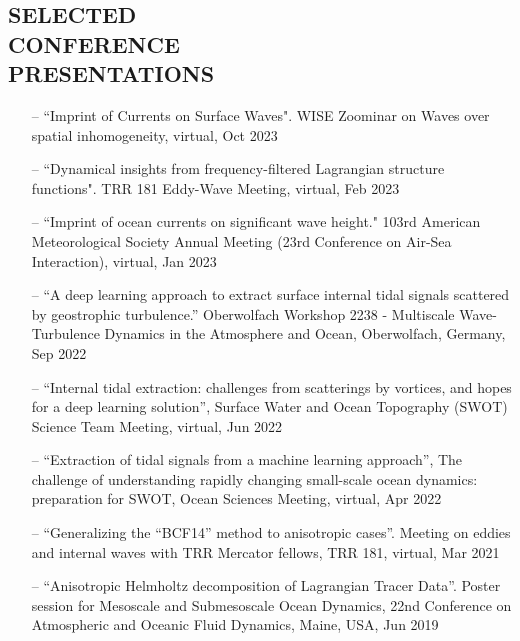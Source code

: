 \documentclass[margin]{res}
\begin{document}
\begin{resume}
\section{{\normalfont SELECTED\\CONFERENCE\\ PRESENTATIONS}}
\begin{itemize}[leftmargin=*,noitemsep]
\item[--]``Imprint of Currents on Surface Waves".  WISE Zoominar on Waves over spatial inhomogeneity, virtual, Oct 2023
\item[--]``Dynamical insights from frequency-filtered Lagrangian structure functions". TRR 181 Eddy-Wave Meeting, virtual, Feb 2023
\item[--] ``Imprint of ocean currents on significant wave height." 103rd American Meteorological Society Annual Meeting (23rd Conference on Air-Sea Interaction), virtual, Jan 2023
\item[--] “A deep learning approach to extract surface internal tidal signals scattered by geostrophic turbulence.”  Oberwolfach Workshop 2238 - Multiscale Wave-Turbulence Dynamics in the Atmosphere and Ocean, Oberwolfach, Germany, Sep 2022
\item[--] “Internal tidal extraction: challenges from scatterings by vortices, and hopes for a deep learning solution”, Surface Water and Ocean Topography (SWOT) Science Team Meeting, virtual, Jun 2022
\item[--] “Extraction of tidal signals from a machine learning approach”, The challenge of understanding rapidly changing small-scale ocean dynamics: preparation for SWOT, Ocean Sciences Meeting, virtual, Apr 2022
\item[--] “Generalizing the “BCF14” method to anisotropic cases”. Meeting on eddies and internal waves with TRR Mercator fellows, TRR 181, virtual, Mar 2021
\item[--] “Anisotropic Helmholtz decomposition of Lagrangian Tracer Data”. Poster session for Mesoscale and Submesoscale Ocean Dynamics, 22nd Conference on Atmospheric and Oceanic Fluid Dynamics, Maine, USA, Jun 2019

\end{itemize}
\end{resume}
\end{document}
